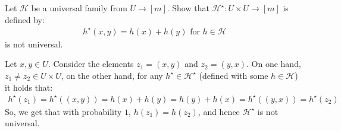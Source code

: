\newcommand*{\TR}{\mathbf{Tr}}
%


%
%
\begin{exercise}
Let $\mathcal{H}$ be a universal family from $U \rightarrow [m]$. Show that $\mathcal{H}^{\star} : U \times U \rightarrow [m]$ is defined by:
  \begin{equation*}
    \begin{split}
      h^{\star}(x,y) = h(x) + h(y)  \text{ for } h\in \mathcal{H}
    \end{split}
  \end{equation*}
  is not universal.
\end{exercise}

\begin{solution}
  Let $x, y \in U$. Consider the elements $z_{1} = (x, y)$ and $z_{2} = (y, x)$. On one hand, $z_{1} \neq z_{2} \in U \times U$, on the other hand, for any $h^{\star} \in \mathcal{H}^{\star}$ (defined with some $h \in \mathcal{H}$) it holds that:
  \begin{equation*}
    \begin{split}
      h^{\star}(z_{1}) =  h^{\star}( (x,y) ) = h(x) + h(y) = h(y) + h(x) =  h^{\star}( (y,x) )  = h^{\star}(z_{2})
    \end{split}
  \end{equation*}
So, we get that with probability $1$, $h(z_{1}) = h(z_{2})$, and hence $\mathcal{H}^{\star}$ is not universal.
\end{solution}


